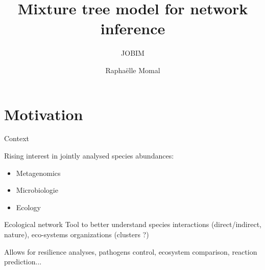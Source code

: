 \documentclass{beamer}
\title{Mixture tree model for network inference}
\subtitle{JOBIM}
\author{Raphaëlle Momal}
\institute{UMR518 AgroParis Tech/INRA}
\newcommand{\emphase}[1]{\textcolor{Complement}{#1}}
\begin{document}
\frame{\titlepage}


\section{Motivation}

\begin{frame}{Context}

Rising interest in \emphase{jointly analysed }species abundances:
\begin{itemize}
	\item Metagenomics 
	\item Microbiologie
	\item Ecology
\end{itemize}

\begin{block}{Ecological network}
Tool to better understand species interactions (direct/indirect, nature), eco-systems organizations (clusters ?) 
\end{block}
Allows for resilience analyses, pathogens control, ecosystem comparison, reaction prediction...
\end{frame}
\end{document}
